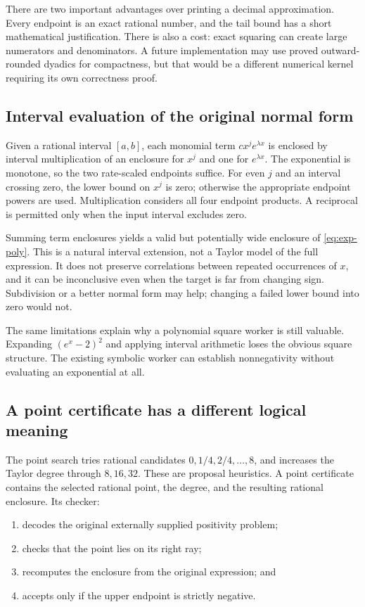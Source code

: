 There are two important advantages over printing a decimal approximation. Every endpoint is an exact rational number, and the tail bound has a short mathematical justification. There is also a cost: exact squaring can create large numerators and denominators. A future implementation may use proved outward-rounded dyadics for compactness, but that would be a different numerical kernel requiring its own correctness proof.

\subsection{Interval evaluation of the original normal form}

Given a rational interval $[a,b]$, each monomial term $cx^je^{\lambda x}$ is enclosed by interval multiplication of an enclosure for $x^j$ and one for $e^{\lambda x}$. The exponential is monotone, so the two rate-scaled endpoints suffice. For even $j$ and an interval crossing zero, the lower bound on $x^j$ is zero; otherwise the appropriate endpoint powers are used. Multiplication considers all four endpoint products. A reciprocal is permitted only when the input interval excludes zero.

Summing term enclosures yields a valid but potentially wide enclosure of \eqref{eq:exp-poly}. This is a natural interval extension, not a Taylor model of the full expression. It does not preserve correlations between repeated occurrences of $x$, and it can be inconclusive even when the target is far from changing sign. Subdivision or a better normal form may help; changing a failed lower bound into zero would not.

The same limitations explain why a polynomial square worker is still valuable. Expanding $(e^x-2)^2$ and applying interval arithmetic loses the obvious square structure. The existing symbolic worker can establish nonnegativity without evaluating an exponential at all.

\subsection{A point certificate has a different logical meaning}

The point search tries rational candidates $0,1/4,2/4,\ldots,8$, and increases the Taylor degree through $8,16,32$. These are proposal heuristics. A point certificate contains the selected rational point, the degree, and the resulting rational enclosure. Its checker:
\begin{enumerate}
\item decodes the original externally supplied positivity problem;
\item checks that the point lies on its right ray;
\item recomputes the enclosure from the original expression; and
\item accepts only if the upper endpoint is strictly negative.
\end{enumerate}

